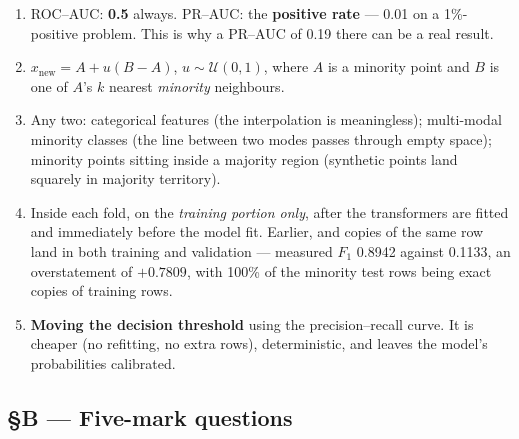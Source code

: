 \documentclass[11pt,a4paper]{article}
\newcommand{\A}[1]{\item[\textbf{#1}]}
\begin{document}
\begin{enumerate}[leftmargin=1.9cm]
$\text{prec} = \frac{TP}{TP+FP}$; $\text{rec} = \frac{TP}{TP+FN}$;
$F_1 = \frac{2TP}{2TP+FP+FN}$;
$\text{bal} = \frac12\left(\frac{TN}{TN+FP} + \frac{TP}{TP+FN}\right)$.
\A{U4.49} ROC--AUC: \textbf{0.5} always. PR--AUC: the \textbf{positive rate}
--- 0.01 on a 1\%-positive problem. This is why a PR--AUC of 0.19 there can be
a real result.
\A{U4.50} $x_{\text{new}} = A + u(B-A)$, $u \sim \mathcal U(0,1)$, where $A$ is
a minority point and $B$ is one of $A$'s $k$ nearest \emph{minority}
neighbours.
\A{U4.51} Any two: categorical features (the interpolation is meaningless);
multi-modal minority classes (the line between two modes passes through empty
space); minority points sitting inside a majority region (synthetic points land
squarely in majority territory).
\A{U4.52} Inside each fold, on the \emph{training portion only}, after the
transformers are fitted and immediately before the model fit. Earlier, and
copies of the same row land in both training and validation --- measured
$F_1$ 0.8942 against 0.1133, an overstatement of $+0.7809$, with 100\% of the
minority test rows being exact copies of training rows.
\A{U4.53} \textbf{Moving the decision threshold} using the precision--recall
curve. It is cheaper (no refitting, no extra rows), deterministic, and leaves
the model's probabilities calibrated.
\end{enumerate}

\subsection*{§B --- Five-mark questions}
\end{document}
